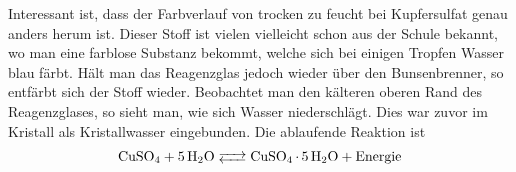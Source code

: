 \documentclass[12pt,a4paper,titlepage,headinclude,bibtotoc]{scrartcl}
\begin{document}
Interessant ist, dass der Farbverlauf von trocken zu feucht bei Kupfersulfat genau anders herum ist.
Dieser Stoff ist vielen vielleicht schon aus der Schule bekannt, wo man eine farblose Substanz bekommt, welche sich bei einigen Tropfen Wasser blau färbt.
Hält man das Reagenzglas jedoch wieder über den Bunsenbrenner, so entfärbt sich der Stoff wieder.
Beobachtet man den kälteren oberen Rand des Reagenzglases, so sieht man, wie sich Wasser niederschlägt.
Dies war zuvor im Kristall als Kristallwasser eingebunden.
Die ablaufende Reaktion ist
\begin{align*}
	\ce{CuSO4 + 5H2O <--> CuSO4 . 5H2O + Energie} 
\end{align*}
\end{document}

